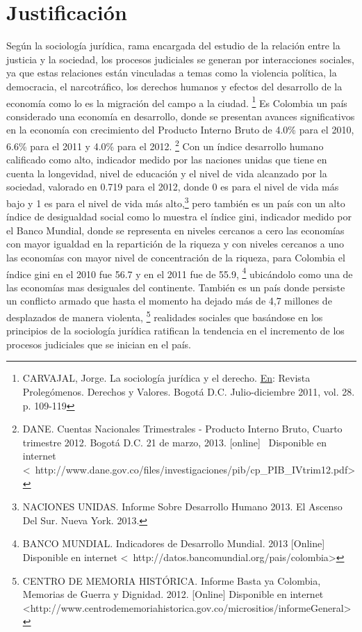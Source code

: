 \chapter{Justificaci\'on}
\label{sec:justificacion}
Seg\'un la sociolog\'ia jur\'idica, rama encargada del estudio de la relaci\'on
entre la justicia y la sociedad, los procesos judiciales se generan por
interacciones sociales, ya que estas relaciones est\'an vinculadas a temas
como la violencia pol\'itica, la democracia, el narcotr\'afico, los derechos
humanos y efectos del desarrollo de la econom\'ia como lo es la migraci\'on
del campo a la ciudad. \footnote{CARVAJAL, Jorge. La sociolog\'ia jur\'idica y el derecho. \underline{En}: Revista Proleg\'omenos. Derechos y Valores. Bogot\'a D.C. Julio-diciembre 2011, vol. 28. p. 109-119} 
Es Colombia un pa\'is considerado una econom\'ia en desarrollo, donde se presentan
avances significativos en la econom\'ia con crecimiento del Producto 
Interno Bruto de 4.0\% para el 2010, 6.6\% para el 2011 y 4.0\% para el 2012. 
\footnote{DANE. Cuentas Nacionales Trimestrales - Producto Interno Bruto, Cuarto trimestre 2012. Bogot\'a D.C. 21 de marzo, 2013. [online]  Disponible en internet 
\textless  http://www.dane.gov.co/files/investigaciones/pib/cp\_PIB\_IVtrim12.pdf\textgreater} 
Con un \'indice desarrollo humano calificado como alto, indicador medido 
por las naciones unidas que tiene en cuenta la longevidad, nivel de 
educaci\'on y el nivel de vida alcanzado por la sociedad, valorado en 
0.719 para el 2012, donde 0 es para el nivel de vida m\'as bajo y 1 es 
para el nivel de vida m\'as alto,\footnote{NACIONES UNIDAS. Informe Sobre Desarrollo Humano 2013. El Ascenso Del Sur. Nueva York. 2013.}  pero tambi\'en es un pa\'is con
un alto \'indice de desigualdad social como lo muestra el \'indice gini, 
indicador medido por el Banco Mundial, donde se representa en niveles 
cercanos a cero las econom\'ias con mayor igualdad en la repartici\'on de 
la riqueza y con niveles cercanos a uno las econom\'ias con mayor nivel 
de concentraci\'on de la riqueza, para Colombia el \'indice gini en el 2010 
fue 56.7 y en el 2011 fue de 55.9, \footnote{BANCO MUNDIAL. Indicadores de Desarrollo Mundial. 2013 [Online] Disponible en internet 
\textless  http://datos.bancomundial.org/pais/colombia\textgreater} ubic\'andolo como 
una de las econom\'ias mas desiguales del continente. Tambi\'en es un pa\'is 
donde persiste un conflicto armado que hasta el momento ha dejado m\'as 
de 4,7 millones de desplazados de manera violenta,
\footnote{CENTRO DE MEMORIA HIST\'ORICA. Informe Basta ya Colombia, Memorias de Guerra y Dignidad. 2012. [Online] Disponible en internet 
\textless http://www.centrodememoriahistorica.gov.co/micrositios/informeGeneral\textgreater} 
realidades sociales que bas\'andose en los principios de la sociolog\'ia 
jur\'idica ratifican la tendencia en el incremento de los procesos 
judiciales que se inician en el pa\'is.
